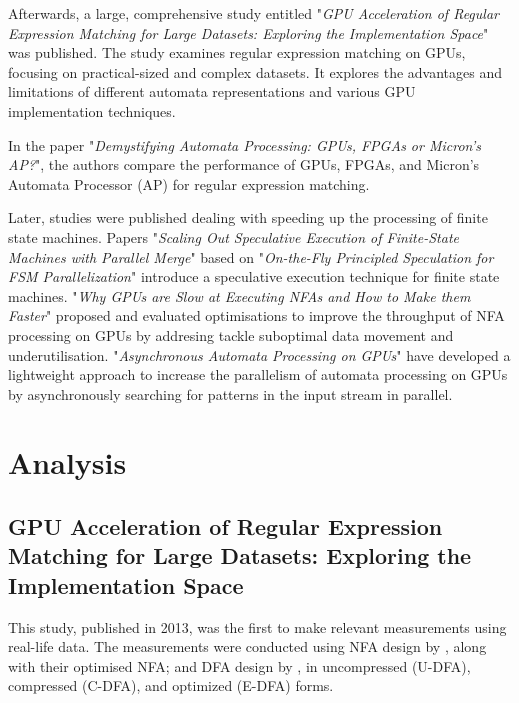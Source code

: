\documentclass[10pt,onecolumn,twoside,english,a4paper]{article}
\begin{document}
Afterwards, a large, comprehensive study entitled "\textit{GPU Acceleration of Regular Expression Matching for Large Datasets: Exploring the Implementation Space}"\cite{Becchi:regex_large_dataset} was published. The study examines regular expression matching on GPUs, focusing on practical-sized and complex datasets. It explores the advantages and limitations of different automata representations and various GPU implementation techniques.

In the paper "\textit{Demystifying Automata Processing: GPUs, FPGAs or Micron's AP?}"\cite{Nourian:DemystifyingFSA}, the authors compare the performance of GPUs, FPGAs, and Micron's Automata Processor (AP) for regular expression matching.

Later, studies were published dealing with speeding up the processing of finite state machines. Papers "\textit{Scaling Out Speculative Execution of Finite-State Machines with Parallel Merge}"\cite{Xia:FSA-scaling} based on "\textit{On-the-Fly Principled Speculation for FSM Parallelization}"\cite{zhao2015fly} introduce a speculative execution technique for finite state machines. "\textit{Why GPUs are Slow at Executing NFAs and How to Make them Faster}"\cite{Liu:WhyGPUSlowNFA} proposed and evaluated optimisations to improve the throughput of NFA processing on GPUs by addresing tackle suboptimal data movement and underutilisation.
"\textit{Asynchronous Automata Processing on GPUs}"\cite{Liu:Asynchronous} have developed a lightweight approach to increase the parallelism of automata processing on GPUs by asynchronously searching for patterns in the input stream in parallel.


\section{Analysis} \label{Analysis}
\subsection{GPU Acceleration of Regular Expression Matching for Large Datasets: Exploring the Implementation Space} \label{Becchi:regex_large_dataset_analysis}
This study\cite{Becchi:regex_large_dataset}, published in 2013, was the first to make relevant measurements using real-life data. The measurements were conducted using NFA design by \cite{cascarano2010infant}, along with their optimised NFA; and DFA design by \cite{becchi2007improved}, in uncompressed (U-DFA), compressed (C-DFA), and optimized (E-DFA) forms.
\end{document}

